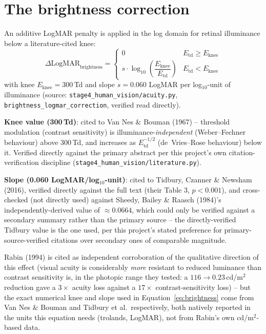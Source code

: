 \section{The brightness correction}
\label{sec:brightness}
An additive LogMAR penalty is applied in the log domain for retinal illuminance below a
literature-cited knee:
\begin{equation}
\Delta\mathrm{LogMAR}_{\mathrm{brightness}} =
\begin{cases}
0 & E_{\mathrm{td}} \ge E_{\mathrm{knee}} \\[4pt]
s \cdot \log_{10}\!\left(\dfrac{E_{\mathrm{knee}}}{E_{\mathrm{td}}}\right) &
E_{\mathrm{td}} < E_{\mathrm{knee}}
\end{cases}
\label{eq:brightness}
\end{equation}
with knee $E_{\mathrm{knee}}=300$\,Td and slope $s=0.060$ LogMAR per log$_{10}$-unit of
illuminance (source: \texttt{stage4\_human\_vision/acuity.py},
\texttt{brightness\_logmar\_correction}, verified read directly).

\textbf{Knee value (300\,Td)}: cited to Van Nes \& Bouman (1967) \citep{vannes1967} --
threshold modulation (contrast sensitivity) is illuminance-\emph{independent}
(Weber--Fechner behaviour) above 300\,Td, and increases as $E_{\mathrm{td}}^{-1/2}$
(de~Vries--Rose behaviour) below it. Verified directly against the primary abstract per
this project's own citation-verification discipline (\texttt{stage4\_human\_vision/literature.py}).

\textbf{Slope (0.060 LogMAR/log$_{10}$-unit)}: cited to Tidbury, Czanner \& Newsham
(2016), verified directly against the full text (their Table 3, $p<0.001$), and
cross-checked (not directly used) against Sheedy, Bailey \& Raasch (1984)'s
independently-derived value of $\approx0.0664$, which could only be verified against a
secondary summary rather than the primary source -- the directly-verified Tidbury value
is the one used, per this project's stated preference for primary-source-verified
citations over secondary ones of comparable magnitude.

Rabin (1994) is cited as independent corroboration of the qualitative direction of this
effect (visual acuity is considerably \emph{more} resistant to reduced luminance than
contrast sensitivity is, in the photopic range they tested: a $116\to0.23\,\mathrm{cd/m^2}$
reduction gave a $3\times$ acuity loss against a $17\times$ contrast-sensitivity loss)
-- but the exact numerical knee and slope used in Equation~\ref{eq:brightness} come from
Van Nes \& Bouman and Tidbury et al.\ respectively, both natively reported in the units
this equation needs (trolands, LogMAR), not from Rabin's own cd/m$^2$-based data.

